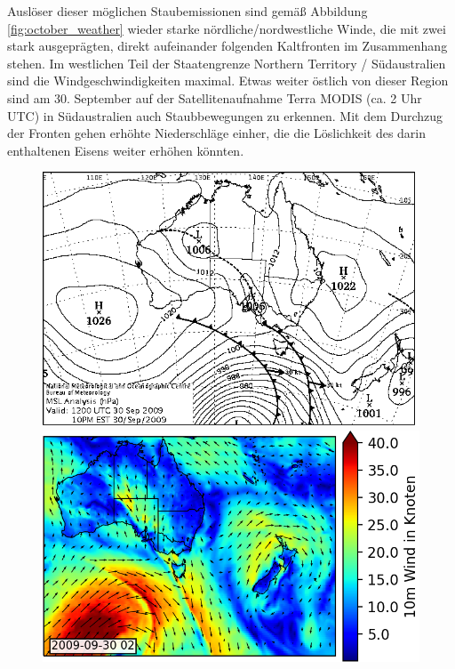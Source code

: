 \documentclass[12pt,a4paper,onecolumn,headheight=30pt]{scrartcl}
\begin{document}
Auslöser dieser möglichen Staubemissionen sind gemäß Abbildung \ref{fig:october_weather} wieder starke nördliche/nordwestliche Winde, die mit zwei stark ausgeprägten, direkt aufeinander folgenden Kaltfronten im Zusammenhang stehen. Im westlichen Teil der Staatengrenze Northern Territory / Südaustralien sind die Windgeschwindigkeiten maximal. Etwas weiter östlich von dieser Region sind am 30. September auf der Satellitenaufnahme Terra MODIS (ca. 2 Uhr UTC) in Südaustralien auch Staubbewegungen zu erkennen. Mit dem Durchzug der Fronten gehen erhöhte Niederschläge einher, die die Löslichkeit des darin enthaltenen Eisens weiter erhöhen könnten. 
\begin{figure}[htbp]
	\begin{minipage}[c]{0.3\textwidth}
		\includegraphics[width=\textwidth]{bilder/20090930T12_msl.png}
	\end{minipage}\hfill
	\begin{minipage}[c]{0.35\textwidth}
		\includegraphics[width=\textwidth]{bilder/wind_october_small.png}

\end{minipage}
\end{figure}
\end{document}
